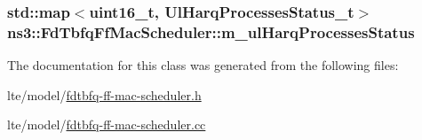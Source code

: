 \subsubsection[{\texorpdfstring{m\+\_\+ul\+Harq\+Processes\+Status}{m_ulHarqProcessesStatus}}]{\setlength{\rightskip}{0pt plus 5cm}std\+::map$<$uint16\+\_\+t, {\bf Ul\+Harq\+Processes\+Status\+\_\+t}$>$ ns3\+::\+Fd\+Tbfq\+Ff\+Mac\+Scheduler\+::m\+\_\+ul\+Harq\+Processes\+Status\hspace{0.3cm}{\ttfamily [private]}}\hypertarget{classns3_1_1FdTbfqFfMacScheduler_aa02927d2f9ea374d54c0fff160b5dbbc}{}\label{classns3_1_1FdTbfqFfMacScheduler_aa02927d2f9ea374d54c0fff160b5dbbc}


The documentation for this class was generated from the following files\+:\begin{DoxyCompactItemize}
\item 
lte/model/\hyperlink{fdtbfq-ff-mac-scheduler_8h}{fdtbfq-\/ff-\/mac-\/scheduler.\+h}\item 
lte/model/\hyperlink{fdtbfq-ff-mac-scheduler_8cc}{fdtbfq-\/ff-\/mac-\/scheduler.\+cc}\end{DoxyCompactItemize}
